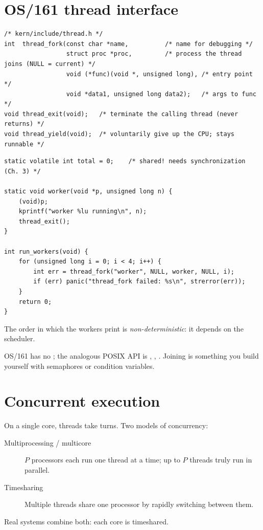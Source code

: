 \section{OS/161 thread interface}

\begin{lstlisting}[style=c]
/* kern/include/thread.h */
int  thread_fork(const char *name,          /* name for debugging */
                 struct proc *proc,         /* process the thread joins (NULL = current) */
                 void (*func)(void *, unsigned long), /* entry point */
                 void *data1, unsigned long data2);   /* args to func */
void thread_exit(void);   /* terminate the calling thread (never returns) */
void thread_yield(void);  /* voluntarily give up the CPU; stays runnable */
\end{lstlisting}

\begin{example}
\begin{lstlisting}[style=c]
static volatile int total = 0;    /* shared! needs synchronization (Ch. 3) */

static void worker(void *p, unsigned long n) {
    (void)p;
    kprintf("worker %lu running\n", n);
    thread_exit();
}

int run_workers(void) {
    for (unsigned long i = 0; i < 4; i++) {
        int err = thread_fork("worker", NULL, worker, NULL, i);
        if (err) panic("thread_fork failed: %s\n", strerror(err));
    }
    return 0;
}
\end{lstlisting}
The order in which the workers print is \emph{non-deterministic}: it depends on the scheduler.
\end{example}

OS/161 has no ; the analogous POSIX API is ,
, . Joining is something you build yourself with
semaphores or condition variables.

\section{Concurrent execution}

On a single core, threads take turns. Two models of concurrency:
\begin{description}
  \item[Multiprocessing / multicore] $P$ processors each run one thread at a time; up to $P$
    threads truly run in parallel.
  \item[Timesharing] Multiple threads share one processor by rapidly switching between them.
\end{description}
Real systems combine both: each core is timeshared.


